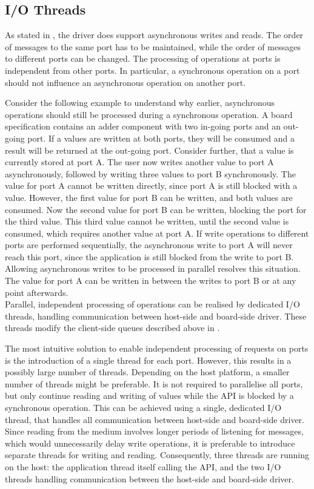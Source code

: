 \documentclass{report}
\begin{document}
\subsection{I/O Threads}
\label{sec:arch:threads}
As stated in , the driver does support asynchronous writes and reads. The order of messages to the same port has to be maintained, while the order of messages to different ports can be changed. The processing of operations at ports is independent from other ports. In particular, a synchronous operation on a port should not influence an asynchronous operation on another port.

Consider the following example to understand why earlier, asynchronous operations should still be processed during a synchronous operation. A board specification contains an adder component with two in-going ports and an out-going port. If a values are written at both ports, they will be consumed and a result will be returned at the out-going port. Consider further, that a value is currently stored at port A. The user now writes another value to port A asynchronously, followed by writing three values to port B synchronously. The value for port A cannot be written directly, since port A is still blocked with a value. However, the first value for port B can be written, and both values are consumed. Now the second value for port B can be written, blocking the port for the third value. This third value cannot be written, until the second value is consumed, which requires another value at port A. If write operations to different ports are performed sequentially, the asynchronous write to port A will never reach this port, since the application is still blocked from the write to port B. Allowing asynchronous writes to be processed in parallel resolves this situation. The value for port A can be written in between the writes to port B or at any point afterwards.\\

Parallel, independent processing of operations can be realised by dedicated I/O threads, handling communication between host-side and board-side driver. These threads modify the client-side queues described above in .

The most intuitive solution to enable independent processing of requests on ports is the introduction of a single thread for each port. However, this results in a possibly large number of threads. Depending on the host platform, a smaller number of threads might be preferable. It is not required to parallelise all ports, but only continue reading and writing of values while the API is blocked by a synchronous operation. This can be achieved using a single, dedicated I/O thread, that handles all communication between host-side and board-side driver. Since reading from the medium involves longer periods of listening for messages, which would unnecessarily delay write operations, it is preferable to introduce separate threads for writing and reading. Consequently, three threads are running on the host: the application thread itself calling the API, and the two I/O threads handling communication between the host-side and board-side driver.
\end{document}
